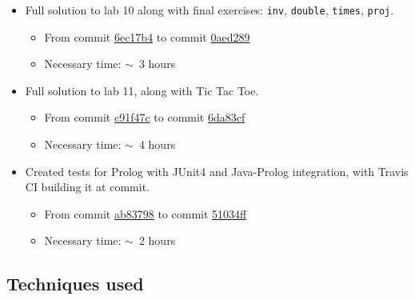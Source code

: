         \begin{itemize}
            \item 
                Full solution to lab 10 along with final exercises: \texttt{inv}, \texttt{double}, \texttt{times}, \texttt{proj}.
                \begin{itemize}
                    \item 
                        From commit \href{https://github.com/NiccoMlt/pps2017-asg03-prolog/commit/6ec17b42595bba0504936dc0f50e471af492fcbc}{6ec17b4}
                        to commit \href{https://github.com/NiccoMlt/pps2017-asg03-prolog/commit/0aed289a42569f624cef6a5fbf398b21d8b5f46b}{0aed289}
                    \item Necessary time: $\sim$~3 hours
                \end{itemize}

            \item 
                Full solution to lab 11, along with Tic Tac Toe.
                \begin{itemize}
                    \item 
                        From commit \href{https://github.com/NiccoMlt/pps2017-asg03-prolog/commit/c91f47c1fa5a28ddef65ef72a5ad05dfd19304ea}{c91f47c}
                        to commit \href{https://github.com/NiccoMlt/pps2017-asg03-prolog/commit/6da83cfa26fff7ec16e4b5fdd3f872c505d26b4e}{6da83cf}
                    \item Necessary time: $\sim$~4 hours
                \end{itemize}

            \item 
                Created tests for Prolog with JUnit4 and Java-Prolog integration, with Travis CI building it at commit.
                \begin{itemize}
                    \item
                        From commit \href{https://github.com/NiccoMlt/pps2017-asg03-prolog/commit/ab8379820fc5f2977b4551446f4358709efe9189}{ab83798}
                        to commit \href{https://github.com/NiccoMlt/pps2017-asg03-prolog/commit/51034ff564fc238570cdb939ed122b70abbc834d}{51034ff}
                    \item Necessary time: $\sim$~2 hours
                \end{itemize}
        \end{itemize}

    \subsection*{Techniques used}


